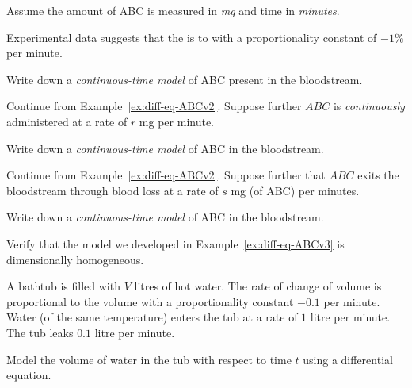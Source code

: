 \documentclass[../main.tex]{subfiles}
\begin{document}
Assume the amount of ABC is measured in \emph{mg} and time in \emph{minutes}.

\begin{example} \label{ex:diff-eq-ABCv1}
  Experimental data suggests that the  is  to  with a proportionality constant of \(-1\%\) per minute.

  Write down a \emph{continuous-time model} of ABC present in the bloodstream.
\end{example}

\begin{example} \label{ex:diff-eq-ABCv2}
  Continue from Example~\ref{ex:diff-eq-ABCv2}.  Suppose further \(ABC\) is \emph{continuously} administered at a rate of \(r\) mg per minute. 

  Write down a \emph{continuous-time model} of ABC in the bloodstream.
\end{example}

\begin{example} \label{ex:diff-eq-ABCv3}
  Continue from Example~\ref{ex:diff-eq-ABCv2}.  Suppose further that \(ABC\) exits the bloodstream through blood loss at a rate of \(s\) mg (of ABC) per minutes. 

  Write down a \emph{continuous-time model} of ABC in the bloodstream.
\end{example}

\begin{example}
  Verify that the model we developed in Example~\ref{ex:diff-eq-ABCv3} is dimensionally homogeneous.
\end{example}

\clearpage

\begin{example}
  A bathtub is filled with \(V\) litres of hot water. The rate of change of volume is proportional to the volume with a proportionality constant \(-0.1\) per minute.  Water (of the same temperature) enters the tub at a rate of \(1\) litre per minute. The tub leaks \(0.1\) litre per minute. 

  Model the volume of water in the tub with respect to time \(t\) using a differential equation.

\end{example}
\end{document}
